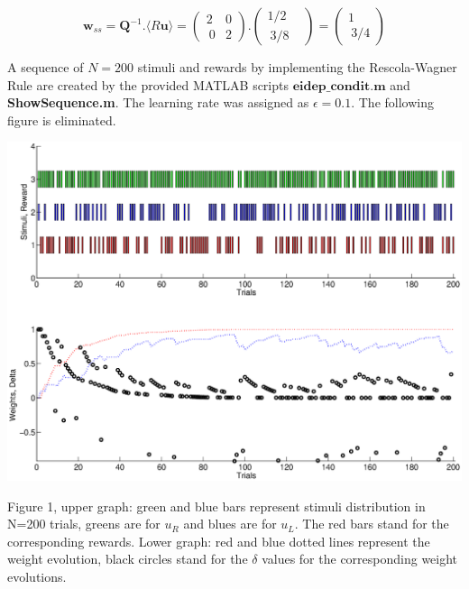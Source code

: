 \documentclass{article}
\begin{document}
\begin{equation*}
\textbf{w}_{ss}= \textbf{Q}^{-1}.\langle R\textbf{u} \rangle= \left ( \begin{array}{cc}  2 & 0 \\ \ 0 & 2  \end{array} \right ) . \left ( \begin{array}{cc}  1/2  \\ \ 3/8 &  \end{array} \right )=\left ( \begin{array}{cc}  1 \\ \ 3/4   \end{array} \right ) 
\end{equation*}

A sequence of $N=200$ stimuli and rewards by implementing the Rescola-Wagner Rule are created by the provided MATLAB scripts $\textbf{eidep}\_\textbf{condit.m}$ and \textbf{ShowSequence.m}. The learning rate was assigned as $\epsilon=0.1$. The following figure is eliminated. 


\begin{center}
\includegraphics[width=\textwidth]{indep.eps}
\begin{footnotesize}
 Figure 1, upper graph: green and blue bars represent stimuli distribution in N=200 trials, greens are for $u_R$ and blues are for $u_L$. The red bars stand for the corresponding rewards. Lower graph: red and blue dotted lines represent the weight evolution, black circles stand for the $\delta$ values for the corresponding weight evolutions.
\end{footnotesize}
\end{center}
\end{document}
